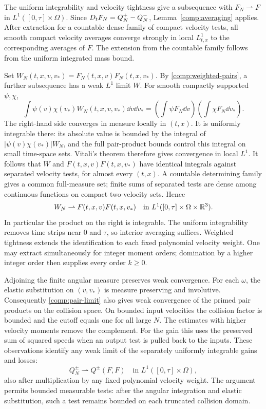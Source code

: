 The uniform integrability and velocity tightness give a subsequence
with $F_N\rightharpoonup F$ in
$L^1([0,\tau]\times\Omega)$.
Since $D_t F_N=Q_N^+-Q_N^-$, Lemma~\ref{comp:averaging} applies.
After extraction for a countable dense family of compact velocity
tests, all smooth compact velocity averages converge strongly in local
$L^1_{t,x}$ to the corresponding averages of $F$.
The extension from the countable family follows from the uniform
integrated mass bound.

Set $W_N(t,x,v,v_*)=F_N(t,x,v)F_N(t,x,v_*)$.
By \eqref{comp:weighted-pairs}, a further subsequence has a weak $L^1$
limit $W$. For smooth compactly supported $\psi,\chi$,
\[
 \int\psi(v)\chi(v_*)W_N(t,x,v,v_*)\dd v\dd v_*
 =\left(\int\psi F_N\dd v\right)
  \left(\int\chi F_N\dd v_*\right).
\]
The right-hand side converges in measure locally in $(t,x)$.
It is uniformly integrable there: its absolute value is bounded by the
integral of $|\psi(v)\chi(v_*)|W_N$, and the full pair-product bounds
control this integral on small time-space sets. Vitali's theorem
therefore gives convergence in local $L^1$.
It follows that $W$ and $F(t,x,v)F(t,x,v_*)$ have identical integrals
against separated velocity tests, for almost every $(t,x)$.
A countable determining family gives a common full-measure set;
finite sums of separated tests are dense among continuous functions on
compact two-velocity sets. Hence
\begin{equation}\label{comp:pair-limit}
 W_N\rightharpoonup F(t,x,v)F(t,x,v_*)
 \quad\text{in }L^1([0,\tau]\times\Omega\times\mathbb R^3).
\end{equation}
In particular the product on the right is integrable.
The uniform integrability removes time strips near $0$ and $\tau$,
so interior averaging suffices. Weighted tightness extends the
identification to each fixed polynomial velocity weight. One may
extract simultaneously for integer moment orders; domination by a
higher integer order then supplies every order $k\ge0$.

Adjoining the finite angular measure preserves weak convergence.
For each $\omega$, the elastic substitution on $(v,v_*)$ is
measure preserving and involutive. Consequently
\eqref{comp:pair-limit} also gives weak convergence of the primed pair
products on the collision space. On bounded input velocities the
collision factor is bounded and the cutoff equals one for all large
$N$. The estimates with higher velocity moments remove the complement.
For the gain this uses the preserved sum of squared speeds when an
output test is pulled back to the inputs. These observations identify
any weak limit of the separately uniformly integrable gains and losses:
\begin{equation}\label{comp:collision-limit}
 Q_N^\pm\rightharpoonup Q^\pm(F,F)
 \quad\text{in }L^1([0,\tau]\times\Omega),
\end{equation}
also after multiplication by any fixed polynomial velocity weight.
The argument permits bounded measurable tests: after the angular
integration and elastic substitution, such a test remains bounded on
each truncated collision domain.

